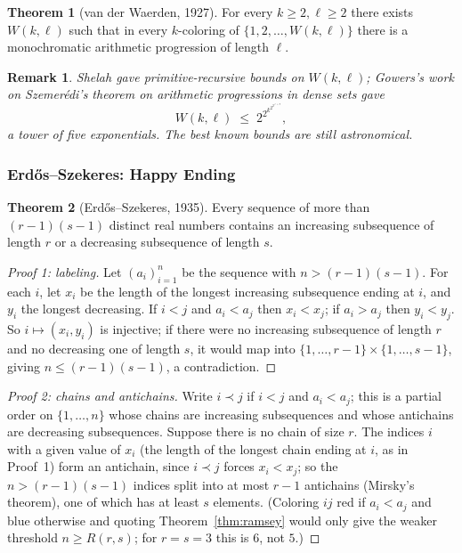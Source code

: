 \documentclass{article}
\newtheorem{remark}{Remark}
\theoremstyle{definition}
\newtheorem{theorem}{Theorem}
\begin{document}
\begin{theorem}[van der Waerden, 1927]
For every $k \ge 2, \ell \ge 2$ there exists $W(k, \ell)$ such that in
every $k$-coloring of $\{1, 2, \dots, W(k, \ell)\}$ there is a
monochromatic arithmetic progression of length $\ell$.
\end{theorem}

\begin{remark}
Shelah gave primitive-recursive bounds on $W(k, \ell)$; Gowers's
work on Szemer\'edi's theorem on arithmetic progressions in dense
sets gave
\[
  W(k, \ell) \;\le\; 2^{2^{k^{2^{2^{\ell + 9}}}}},
\]
a tower of five exponentials. The best known bounds are still
astronomical.
\end{remark}

\subsubsection{Erd\H{o}s--Szekeres: Happy Ending}

\begin{theorem}[Erd\H{o}s--Szekeres, 1935]\label{thm:erdos-szekeres}
Every sequence of more than $(r - 1)(s - 1)$ distinct real numbers
contains an increasing subsequence of length $r$ or a decreasing
subsequence of length $s$.
\end{theorem}

\begin{proof}[Proof 1: labeling]
Let $(a_i)_{i=1}^n$ be the sequence with $n > (r - 1)(s - 1)$. For
each $i$, let $x_i$ be the length of the longest increasing
subsequence ending at $i$, and $y_i$ the longest decreasing.
If $i < j$ and $a_i < a_j$ then $x_i < x_j$; if $a_i > a_j$ then
$y_i < y_j$. So $i \mapsto (x_i, y_i)$ is injective; if there were no
increasing subsequence of length $r$ and no decreasing one of length
$s$, it would map into $\{1, \dots, r - 1\} \times \{1, \dots, s - 1\}$,
giving $n \le (r - 1)(s - 1)$, a contradiction.
\end{proof}

\begin{proof}[Proof 2: chains and antichains]
Write $i \prec j$ if $i < j$ and $a_i < a_j$; this is a partial order on
$\{1, \dots, n\}$ whose chains are increasing subsequences and whose
antichains are decreasing subsequences. Suppose there is no chain of
size $r$. The indices $i$ with a given value of $x_i$ (the length of the
longest chain ending at $i$, as in Proof~1) form an antichain, since
$i \prec j$ forces $x_i < x_j$; so the $n > (r - 1)(s - 1)$ indices split
into at most $r - 1$ antichains (Mirsky's theorem), one of which has at
least $s$ elements. (Coloring $ij$ red if $a_i < a_j$ and blue otherwise
and quoting Theorem~\ref{thm:ramsey} would only give the weaker
threshold $n \ge R(r, s)$; for $r = s = 3$ this is $6$, not $5$.)
\end{proof}
\end{document}
